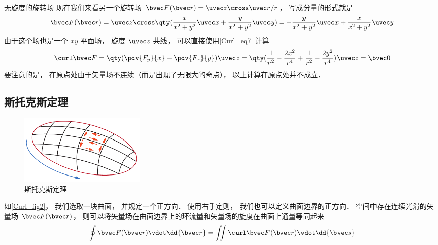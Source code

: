 \begin{exam}{无旋度的旋转场}
现在我们来看另一个旋转场 $\bvec F(\bvec r) = \uvec z\cross\uvec r /r$， 写成分量的形式就是
\begin{equation}
\bvec F(\bvec r) = \uvec z \cross \qty(\frac{x}{x^2 + y^2}\uvec x + \frac{y}{x^2 + y^2}\uvec y) = -\frac{y}{x^2 + y^2} \uvec x + \frac{x}{x^2 + y^2}\uvec y
\end{equation}
由于这个场也是一个 $xy$ 平面场， 旋度 $\uvec z$ 共线， 可以直接使用\autoref{Curl_eq7} 计算
\begin{equation}
\curl\bvec F = \qty(\pdv{F_y}{x} - \pdv{F_x}{y})\uvec z = \qty(\frac{1}{r^2} - \frac{2x^2}{r^4} + \frac{1}{r^2} - \frac{2y^2}{r^4})\uvec z = \bvec 0
\end{equation}
要注意的是， 在原点处由于矢量场不连续（而是出现了无限大的奇点）， 以上计算在原点处并不成立． 
\end{exam}

\subsection{斯托克斯定理}

\begin{figure}[ht]
\centering
\includegraphics[width=6cm]{./figures/Curl2.pdf}
\caption{斯托克斯定理} \label{Curl_fig2}
\end{figure}

如\autoref{Curl_fig2}， 我们选取一块曲面， 并规定一个正方向． 使用右手定则， 我们也可以定义曲面边界的正方向． 空间中存在连续光滑的矢量场 $\bvec F(\bvec r)$， 则可以将矢量场在曲面边界上的环流量和矢量场的旋度在曲面上通量等同起来
\begin{equation}
\oint \bvec F(\bvec r) \vdot \dd{\bvec r} = \iint \curl \bvec F(\bvec r) \vdot \dd{\bvec s}
\end{equation}


